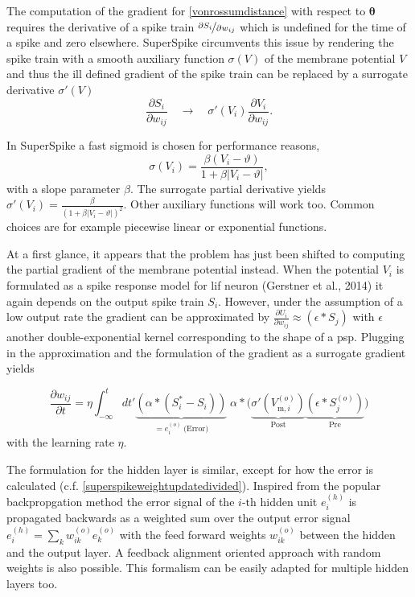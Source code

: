 The computation of the gradient for \ref{vonrossumdistance} with respect to $\mathbf{\theta}$ requires the derivative of a spike train  $\nicefrac{\partial{S_i}}{\partial{w_{ij}}}$ which is undefined for the time of a spike and zero elsewhere. SuperSpike circumvents this issue by rendering the spike train with a smooth auxiliary function $\sigma(V)$ of the membrane potential $V$ and thus the ill defined gradient of the spike train can be replaced by a surrogate derivative $\sigma'(V)$
\begin{equation*}
\frac{\partial S_i}{\partial w_{ij}} \quad \rightarrow \quad \sigma'(V_i)\frac{\partial V_i}{\partial w_{ij}}.
\end{equation*}

In SuperSpike a fast sigmoid is chosen for performance reasons, 
\begin{equation}
\sigma(V_i) = \frac{\beta (V_i - \vartheta)}{1 + \beta |V_i - \vartheta|},
\label{auxilliaryfunction}
\end{equation}
with a slope parameter $\beta$. The surrogate partial derivative yields $\sigma'(V_i) = \frac{\beta}{(1 + \beta |V_i - \vartheta|)^2}$. Other auxiliary functions will work too. Common choices are for example piecewise linear or exponential functions.

At a first glance, it appears that the problem has just been shifted to computing the partial gradient of the membrane potential instead. When the potential $V_i$ is formulated as a spike response model for \gls{lif} neuron (Gerstner et al., 2014) it again depends on the output spike train $S_i$. However, under the assumption of a low output rate the gradient can be approximated by $\frac{\partial U_i}{\partial w_{ij}} \approx (\epsilon \ast S_j)$ with $\epsilon$ another double-exponential kernel corresponding to the shape of a \gls{psp}. Plugging in the approximation and the formulation of the gradient as a surrogate gradient yields

\begin{equation}
\frac{\partial w_{ij}}{\partial t} = \eta \int_{-\infty}^{t} dt'
\underbrace{\left(\alpha \ast (S^*_i - S_i)\right)}_{= e^{(o)}_i \; \text{(Error)}} 
\; \alpha \ast 
\Big(\underbrace{\sigma'(V^{(o)}_{\text{m},i})}_{\text{Post}} 
\underbrace{\left(\epsilon \ast S^{(o)}_j\right)}_{\text{Pre}}\Big)
\label{superspikeweightupdateeq}
\end{equation}
with the learning rate $\eta$. 

The formulation for the hidden layer is similar, except for how the error is calculated (c.f. \cref{superspikeweightupdatedivided}). Inspired from the popular backpropgation method the error signal of the $i \text{-th}$ hidden unit $e^{(h)}_i$ is propagated backwards as a weighted sum over the output error signal $e^{(h)}_i = \sum_{k} w_{ik}^{(o)} e^{(o)}_k$ with the feed forward weights $w_{ik}^{(o)}$ between the hidden and the output layer. A feedback alignment oriented approach with random weights is also possible. This formalism can be easily adapted for multiple hidden layers too.


